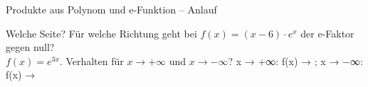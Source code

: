 \setcounter{aufgabe}{0}

\begin{aufgabe}{Produkte aus Polynom und e-Funktion – Anlauf}
\begin{teile}
\teil Welche Seite? Für welche Richtung geht bei $f(x) = (x - 6) \cdot e^{x}$ der e-Faktor gegen null?  \\ 
\teil $f(x) = e^{3x}$. Verhalten für $x \to +\infty$ und $x \to -\infty$? x → +∞: f(x) → \leerfeld ; x → −∞: f(x) → \leerfeld
\end{teile}
\end{aufgabe}

